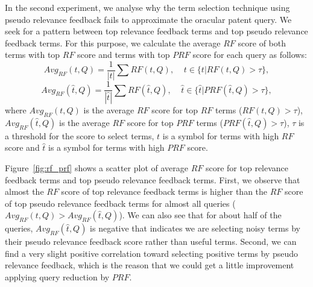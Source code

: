 In the second experiment, we analyse why the term selection technique using pseudo relevance feedback fails to approximate the oracular patent query.  
We seek for a pattern between top relevance feedback terms and top pseudo relevance feedback terms. For this purpose, we calculate the average $\mathit{RF}$ score of both terms with top  $\mathit{RF}$ score and terms with top $\mathit{PRF}$ score for each query as follows:
\begin{equation}
Avg_{RF}(t, Q) = \frac{1}{|t|}\sum {RF}(t, Q), \;\;\;\; t\in \{t | RF(t, Q)>\tau\},
\end{equation}
\begin{equation}
Avg_{RF}(\hat{t}, Q) = \frac{1}{|\hat{t}|}\sum {RF}(\hat{t}, Q), \;\;\;\; \hat{t}\in \{\hat{t} | PRF(\hat{t}, Q)>\tau\},
\end{equation}
where $Avg_{RF}(t, Q)$ is the average  $\mathit{RF}$ score for top  $\mathit{RF}$ terms ($RF(t, Q)>\tau$), $Avg_{RF}(\hat{t}, Q)$ is the average  $\mathit{RF}$ score for top  $\mathit{PRF}$ terms ($PRF(\hat{t}, Q)>\tau$), $\tau$ is a threshold for the score to select terms, $t$ is a symbol for terms with high $\mathit{RF}$ score and $\hat{t}$ is a symbol for terms with high $\mathit{PRF}$ score.

Figure~\ref{fig:rf_prf} shows a scatter plot of average $\mathit{RF}$ score for top relevance feedback terms and top pseudo relevance feedback terms. First, we observe that almost the $\mathit{RF}$ score of top relevance feedback terms is higher than the $\mathit{RF}$ score of top pseudo relevance feedback terms for almost all queries ($ Avg_{RF}(t, Q) > Avg_{RF}(\hat{t}, Q)$). We can also see that for about half of the queries, $Avg_{RF}(\hat{t}, Q)$ is negative that indicates we are selecting noisy terms by their pseudo relevance feedback score rather than useful terms. Second, we can find a very slight positive correlation toward selecting positive terms by pseudo relevance feedback, which is the reason that we could get a little improvement applying query reduction by $\mathit{PRF}$.  

